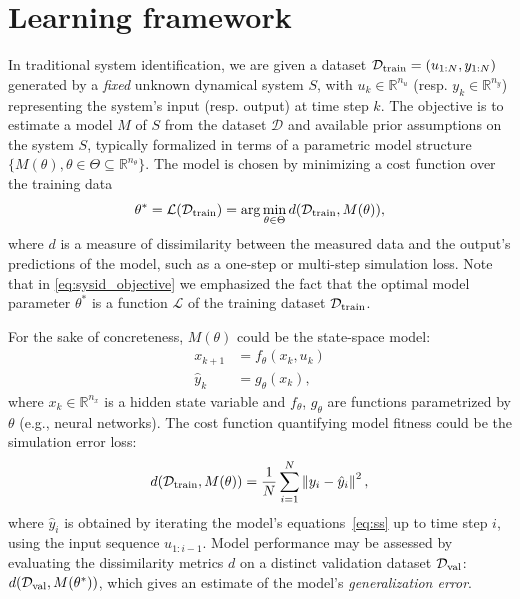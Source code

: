 \documentclass{article}
\newcommand{\sys}{S}
\newcommand{\diss}{d}
\newcommand{\learn}{\mathcal{L}}
\newcommand{\D}{\mathcal{D}}
\newcommand{\R}{\mathbb{R}}
\newcommand{\nsamp}{N}
\newcommand{\norm}[1]{\left\lVert#1\right\rVert}
\begin{document}
 
\section{Learning framework}



In traditional  system identification, we are given a dataset $\D_{\rm train} = (u_{1:\nsamp}, y_{1:\nsamp})$ 
generated by a \emph{fixed} unknown dynamical system $\sys$, with $u_k \in \mathbb{R}^{n_u}$ (resp. $y_k  \in \mathbb{R}^{n_y}$) representing the system's input (resp. output) at time step $k$. The objective is to estimate a model $M$ of $\sys$ from the dataset $\D$ and available prior assumptions on the system $\sys$, typically formalized in terms of a parametric model structure $\{M(\theta), \theta \in \Theta \subseteq \mathbb{R}^{n_\theta} \}$.
% 
The model is chosen by minimizing a cost function over the training data
\begin{equation}
\label{eq:sysid_objective}
\theta^* = \learn({\D_{\rm train}}) = \arg \min_{\theta \in \Theta} \diss(\D_{\rm train}, M(\theta)),
\end{equation}
where $\diss$ is a measure of dissimilarity between the measured data and the output's predictions of the model, such as a one-step or multi-step simulation loss. Note that in \eqref{eq:sysid_objective} we emphasized the fact that the optimal model parameter $\theta^*$ is a function $ \learn$ of the training dataset $\D_{\rm train}$.

For the sake of concreteness, $M(\theta)$ could be the 
state-space model:
\begin{subequations}
\label{eq:ss}
\begin{align}
x_{k + 1} &= f_\theta(x_k, u_k)\\
\hat y_k &= g_\theta(x_k),
\end{align}
\end{subequations}
where $x_k \in \R^{n_x}$ is a hidden state variable and $f_{\theta}$, $g_{\theta}$ are functions parametrized by  $\theta$ (e.g., neural networks). The cost function quantifying model fitness could be 
the simulation error loss:
\begin{equation}
\diss(\D_{\rm train}, M(\theta)) = \frac{1}{\nsamp} \sum_{i=1}^{\nsamp} \norm{y_i- \hat y_{i}}^2, %
\end{equation}
where $\hat y_{i}$ is obtained by iterating the model's equations~\eqref{eq:ss} up to time step $i$, using the input sequence $u_{1:i-1}$.
Model performance may be assessed by evaluating the dissimilarity metrics $\diss$
on a distinct validation dataset $\D_{\rm val}$:
$\diss(\D_{\rm val}, M(\theta^*))$, which  gives an   estimate of the model's \emph{generalization error}.
\end{document}
